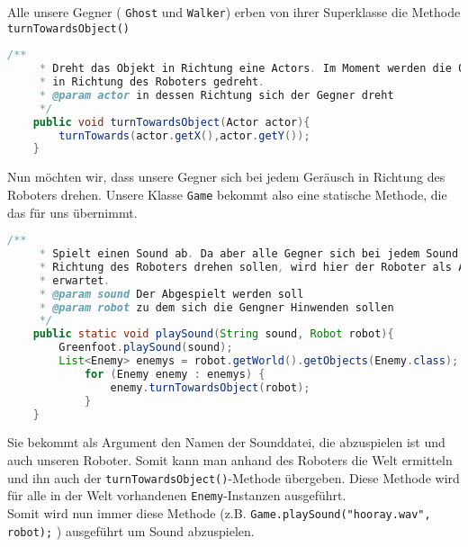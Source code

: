 \documentclass{pi1}
\begin{document}
Alle unsere Gegner ( \texttt{Ghost} und  \texttt{Walker}) erben von ihrer Superklasse die Methode \texttt{turnTowardsObject()}

\begin{lstlisting}[caption={Methode \emph{turnTowardsObject()}}, firstnumber=31, language=Java]
/**
     * Dreht das Objekt in Richtung eine Actors. Im Moment werden die Objekte
     * in Richtung des Roboters gedreht.
     * @param actor in dessen Richtung sich der Gegner dreht
     */
    public void turnTowardsObject(Actor actor){
        turnTowards(actor.getX(),actor.getY());
    }
\end{lstlisting}

Nun möchten wir, dass unsere Gegner sich bei jedem Geräusch in Richtung des Roboters drehen. Unsere Klasse \texttt{Game} bekommt also eine statische Methode, die das für uns übernimmt.

\begin{lstlisting}[caption={Methode \emph{playSound()} in der Klasse Game}, firstnumber=43, language=Java]
/**
     * Spielt einen Sound ab. Da aber alle Gegner sich bei jedem Sound in
     * Richtung des Roboters drehen sollen, wird hier der Roboter als Argument
     * erwartet.
     * @param sound Der Abgespielt werden soll
     * @param robot zu dem sich die Gengner Hinwenden sollen
     */
    public static void playSound(String sound, Robot robot){
        Greenfoot.playSound(sound);
        List<Enemy> enemys = robot.getWorld().getObjects(Enemy.class);
            for (Enemy enemy : enemys) {
                enemy.turnTowardsObject(robot);
            }
    }
\end{lstlisting}

Sie bekommt als Argument den Namen der Sounddatei, die abzuspielen ist und auch unseren Roboter. Somit kann man anhand des Roboters die Welt ermitteln und ihn auch der  \texttt{turnTowardsObject()}-Methode übergeben. Diese Methode wird für alle in der Welt vorhandenen  \texttt{Enemy}-Instanzen ausgeführt.\\
Somit wird nun immer diese Methode (z.B. \texttt{Game.playSound("hooray.wav", robot);} ) ausgeführt um Sound abzuspielen.
\end{document}
